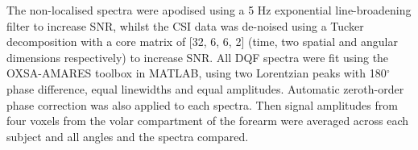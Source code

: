 The non-localised spectra were apodised using a 5 Hz exponential line-broadening filter to increase \ac{SNR}, whilst the \ac{CSI} data was de-noised using a Tucker decomposition \cite{Bader2007EfficientTensors} with a core matrix of [32, 6, 6, 2] (time, two spatial and angular dimensions respectively) to increase \ac{SNR}. All \ac{DQF} spectra were fit using the OXSA-AMARES \cite{Purvis2017OXSA:MATLAB} toolbox in MATLAB, using two Lorentzian peaks with 180$^\circ$ phase difference, equal linewidths and equal amplitudes. Automatic zeroth-order phase correction was also applied to each spectra. Then signal amplitudes from four voxels from the volar compartment of the forearm were averaged across each subject and all angles and the spectra compared.

